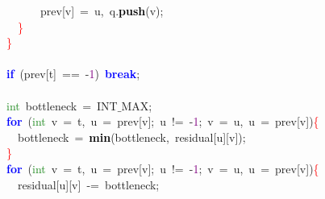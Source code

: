 {{\mbox{}\ \ \ \ \ \ \ \ \ \ prev\textcolor{BrickRed}{[}v\textcolor{BrickRed}{]}\ \textcolor{BrickRed}{=}\ u\textcolor{BrickRed}{,}\ q\textcolor{BrickRed}{.}\textbf{\textcolor{Black}{push}}\textcolor{BrickRed}{(}v\textcolor{BrickRed}{);} \\
\mbox{}\ \ \ \ \ \ \textcolor{Red}{\}} \\
\mbox{}\ \ \ \ \textcolor{Red}{\}} \\
\mbox{} \\
\mbox{}\ \ \ \ \textbf{\textcolor{Blue}{if}}\ \textcolor{BrickRed}{(}prev\textcolor{BrickRed}{[}t\textcolor{BrickRed}{]}\ \textcolor{BrickRed}{==}\ \textcolor{BrickRed}{-}\textcolor{Purple}{1}\textcolor{BrickRed}{)}\ \textbf{\textcolor{Blue}{break}}\textcolor{BrickRed}{;} \\
\mbox{} \\
\mbox{}\ \ \ \ \textcolor{ForestGreen}{int}\ bottleneck\ \textcolor{BrickRed}{=}\ INT$\_$MAX\textcolor{BrickRed}{;} \\
\mbox{}\ \ \ \ \textbf{\textcolor{Blue}{for}}\ \textcolor{BrickRed}{(}\textcolor{ForestGreen}{int}\ v\ \textcolor{BrickRed}{=}\ t\textcolor{BrickRed}{,}\ u\ \textcolor{BrickRed}{=}\ prev\textcolor{BrickRed}{[}v\textcolor{BrickRed}{];}\ u\ \textcolor{BrickRed}{!=}\ \textcolor{BrickRed}{-}\textcolor{Purple}{1}\textcolor{BrickRed}{;}\ v\ \textcolor{BrickRed}{=}\ u\textcolor{BrickRed}{,}\ u\ \textcolor{BrickRed}{=}\ prev\textcolor{BrickRed}{[}v\textcolor{BrickRed}{])}\textcolor{Red}{\{} \\
\mbox{}\ \ \ \ \ \ bottleneck\ \textcolor{BrickRed}{=}\ \textbf{\textcolor{Black}{min}}\textcolor{BrickRed}{(}bottleneck\textcolor{BrickRed}{,}\ residual\textcolor{BrickRed}{[}u\textcolor{BrickRed}{][}v\textcolor{BrickRed}{]);} \\
\mbox{}\ \ \ \ \textcolor{Red}{\}} \\
\mbox{}\ \ \ \ \textbf{\textcolor{Blue}{for}}\ \textcolor{BrickRed}{(}\textcolor{ForestGreen}{int}\ v\ \textcolor{BrickRed}{=}\ t\textcolor{BrickRed}{,}\ u\ \textcolor{BrickRed}{=}\ prev\textcolor{BrickRed}{[}v\textcolor{BrickRed}{];}\ u\ \textcolor{BrickRed}{!=}\ \textcolor{BrickRed}{-}\textcolor{Purple}{1}\textcolor{BrickRed}{;}\ v\ \textcolor{BrickRed}{=}\ u\textcolor{BrickRed}{,}\ u\ \textcolor{BrickRed}{=}\ prev\textcolor{BrickRed}{[}v\textcolor{BrickRed}{])}\textcolor{Red}{\{} \\
\mbox{}\ \ \ \ \ \ residual\textcolor{BrickRed}{[}u\textcolor{BrickRed}{][}v\textcolor{BrickRed}{]}\ \textcolor{BrickRed}{-=}\ bottleneck\textcolor{BrickRed}{;} \\
}}
